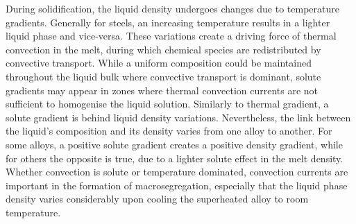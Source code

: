 During solidification, the liquid density undergoes changes due to temperature gradients.
Generally for steels, an increasing temperature results in a lighter liquid phase and vice-versa.
These variations create a driving force of thermal convection in the melt, during which 
chemical species are redistributed by convective transport. While a uniform composition
could be maintained throughout the liquid bulk where convective transport is dominant, 
solute gradients may appear in zones where thermal convection currents are not sufficient to homogenise the liquid solution. 
Similarly to thermal gradient, a solute gradient is behind liquid density variations.
Nevertheless, the link between the liquid's composition and its density varies from one alloy to another. 
For some alloys, a positive solute gradient creates a positive density gradient, while
for others the opposite is true, due to a lighter solute effect in the melt density. Whether convection is solute or temperature
dominated, convection currents are important in the formation of macrosegregation, especially that the
liquid phase density varies considerably upon cooling the superheated alloy to room temperature.

%
%
%
%
% 

